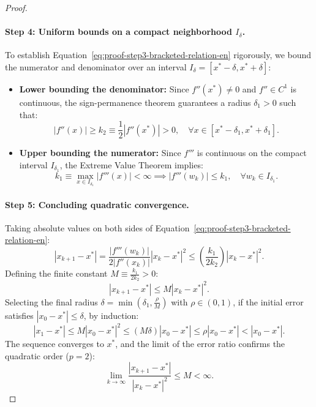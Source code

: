 \begin{proof}
\paragraph{Step 4: Uniform bounds on a compact neighborhood $I_\delta$.}
To establish Equation~\eqref{eq:proof-step3-bracketed-relation-en} rigorously, we bound the numerator and denominator over an interval $I_\delta = [x^* - \delta, x^* + \delta]$:
\begin{itemize}
    \item \textbf{Lower bounding the denominator:} Since $f''(x^*) \ne 0$ and $f'' \in C^1$ is continuous, the sign-permanence theorem guarantees a radius $\delta_1 > 0$ such that:
    \begin{equation}
        |f''(x)| \ge k_2 \equiv \frac{1}{2} |f''(x^*)| > 0, \quad \forall x \in [x^* - \delta_1, x^* + \delta_1].
    \end{equation}
    \item \textbf{Upper bounding the numerator:} Since $f'''$ is continuous on the compact interval $I_{\delta_1}$, the Extreme Value Theorem implies:
    \begin{equation}
        k_1 \equiv \max_{x \in I_{\delta_1}} |f'''(x)| < \infty \implies |f'''(w_k)| \le k_1, \quad \forall w_k \in I_{\delta_1}.
    \end{equation}
\end{itemize}

\paragraph{Step 5: Concluding quadratic convergence.}
Taking absolute values on both sides of Equation~\eqref{eq:proof-step3-bracketed-relation-en}:
\begin{equation}
    |x_{k+1} - x^*| = \frac{|f'''(w_k)|}{2 |f''(x_k)|} |x_k - x^*|^2 \le \left( \frac{k_1}{2 k_2} \right) |x_k - x^*|^2.
\end{equation}
Defining the finite constant $M \equiv \frac{k_1}{2 k_2} > 0$:
\begin{equation}
    |x_{k+1} - x^*| \le M |x_k - x^*|^2.
\end{equation}
Selecting the final radius $\delta = \min(\delta_1, \frac{\rho}{M})$ with $\rho \in (0, 1)$, if the initial error satisfies $|x_0 - x^*| \le \delta$, by induction:
\begin{equation}
    |x_1 - x^*| \le M |x_0 - x^*|^2 \le (M \delta) |x_0 - x^*| \le \rho |x_0 - x^*| < |x_0 - x^*|.
\end{equation}
The sequence converges to $x^*$, and the limit of the error ratio confirms the quadratic order ($p = 2$):
\begin{equation}
    \lim_{k \to \infty} \frac{|x_{k+1} - x^*|}{|x_k - x^*|^2} \le M < \infty.
\end{equation}
\end{proof}

